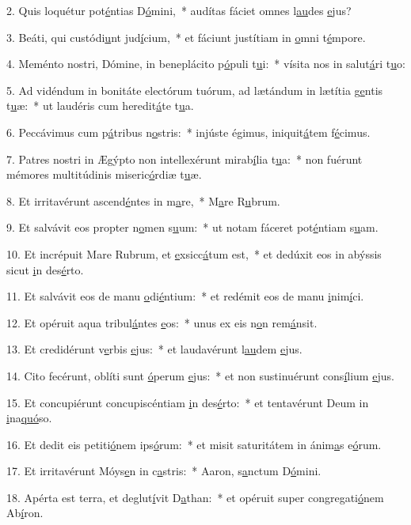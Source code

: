 2. Quis loquétur pot\uline{é}ntias D\uline{ó}mini,~* audítas fáciet omnes l\uline{au}des \uline{e}jus?\par 
3. Beáti, qui custódi\uline{u}nt jud\uline{í}cium,~* et fáciunt justítiam in \uline{o}mni t\uline{é}mpore.\par 
4. Meménto nostri, Dómine, in beneplácito p\uline{ó}puli t\uline{u}i:~* vísita nos in salut\uline{á}ri t\uline{u}o:\par 
5. Ad vidéndum in bonitáte electórum tuórum, ad lætándum in lætítia g\uline{e}ntis t\uline{u}æ:~* ut laudéris cum heredit\uline{á}te t\uline{u}a.\par 
6. Peccávimus cum p\uline{á}tribus n\uline{o}stris:~* injúste égimus, iniquit\uline{á}tem f\uline{é}cimus.\par 
7. Patres nostri in Ægýpto non intellexérunt mirab\uline{í}lia t\uline{u}a:~* non fuérunt mémores multitúdinis miseric\uline{ó}rdiæ t\uline{u}æ.\par 
8. Et irritavérunt ascend\uline{é}ntes in m\uline{a}re,~* M\uline{a}re R\uline{u}brum.\par 
9. Et salvávit eos propter n\uline{o}men s\uline{u}um:~* ut notam fáceret pot\uline{é}ntiam s\uline{u}am.\par 
10. Et incrépuit Mare Rubrum, et \uline{e}xsicc\uline{á}tum est,~* et dedúxit eos in abýssis sicut \uline{i}n des\uline{é}rto.\par 
11. Et salvávit eos de manu \uline{o}di\uline{é}ntium:~* et redémit eos de manu \uline{i}nim\uline{í}ci.\par 
12. Et opéruit aqua tribul\uline{á}ntes \uline{e}os:~* unus ex eis n\uline{o}n rem\uline{á}nsit.\par 
13. Et credidérunt v\uline{e}rbis \uline{e}jus:~* et laudavérunt l\uline{au}dem \uline{e}jus.\par 
14. Cito fecérunt, oblíti sunt \uline{ó}perum \uline{e}jus:~* et non sustinuérunt cons\uline{í}lium \uline{e}jus.\par 
15. Et concupiérunt concupiscéntiam \uline{i}n des\uline{é}rto:~* et tentavérunt Deum in \uline{i}na\uline{quó}so.\par 
16. Et dedit eis petiti\uline{ó}nem ips\uline{ó}rum:~* et misit saturitátem in ánim\uline{a}s e\uline{ó}rum.\par 
17. Et irritavérunt Móys\uline{e}n in c\uline{a}stris:~* Aaron, s\uline{a}nctum D\uline{ó}mini.\par 
18. Apérta est terra, et deglut\uline{í}vit D\uline{a}than:~* et opéruit super congregati\uline{ó}nem Ab\uline{í}ron.\par 
